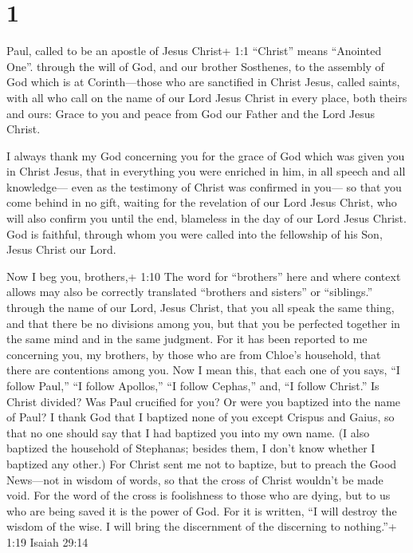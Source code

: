\hypertarget{section}{%
\section{1}\label{section}}

 Paul, called to be an apostle of Jesus Christ+ 1:1
``Christ'' means ``Anointed One''. through the will of God, and our
brother Sosthenes,  to the assembly of God which is at
Corinth---those who are sanctified in Christ Jesus, called saints, with
all who call on the name of our Lord Jesus Christ in every place, both
theirs and ours:  Grace to you and peace from God our Father
and the Lord Jesus Christ.

 I always thank my God concerning you for the grace of God
which was given you in Christ Jesus,  that in everything you
were enriched in him, in all speech and all knowledge--- 
even as the testimony of Christ was confirmed in you---  so
that you come behind in no gift, waiting for the revelation of our Lord
Jesus Christ,  who will also confirm you until the end,
blameless in the day of our Lord Jesus Christ.  God is
faithful, through whom you were called into the fellowship of his Son,
Jesus Christ our Lord.

 Now I beg you, brothers,+ 1:10 The word for ``brothers''
here and where context allows may also be correctly translated
``brothers and sisters'' or ``siblings.'' through the name of our Lord,
Jesus Christ, that you all speak the same thing, and that there be no
divisions among you, but that you be perfected together in the same mind
and in the same judgment.  For it has been reported to me
concerning you, my brothers, by those who are from Chloe's household,
that there are contentions among you.  Now I mean this,
that each one of you says, ``I follow Paul,'' ``I follow Apollos,'' ``I
follow Cephas,'' and, ``I follow Christ.''  Is Christ
divided? Was Paul crucified for you? Or were you baptized into the name
of Paul?  I thank God that I baptized none of you except
Crispus and Gaius,  so that no one should say that I had
baptized you into my own name.  (I also baptized the
household of Stephanas; besides them, I don't know whether I baptized
any other.)  For Christ sent me not to baptize, but to
preach the Good News---not in wisdom of words, so that the cross of
Christ wouldn't be made void.  For the word of the cross is
foolishness to those who are dying, but to us who are being saved it is
the power of God.  For it is written, ``I will destroy the
wisdom of the wise. I will bring the discernment of the discerning to
nothing.''+ 1:19 Isaiah 29:14

